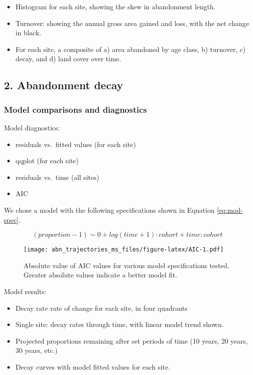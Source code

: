 \documentclass[
]{article}
\providecommand{\tightlist}{%
  \setlength{\itemsep}{0pt}\setlength{\parskip}{0pt}}
\begin{document}
\begin{itemize}
\tightlist
\item
  Histogram for each site, showing the skew in abandonment length.
\item
  Turnover: showing the annual gross area gained and loss, with the net change in black.
\item
  For each site, a composite of a) area abandoned by age class, b) turnover, c) decay, and d) land cover over time.
\end{itemize}

\hypertarget{abandonment-decay}{%
\subsection{2. Abandonment decay}\label{abandonment-decay}}

\hypertarget{mod-AIC-diag}{%
\subsubsection{Model comparisons and diagnostics}\label{mod-AIC-diag}}

Model diagnostics:

\begin{itemize}
\tightlist
\item
  residuals vs.~fitted values (for each site)
\item
  qqplot (for each site)
\item
  residuals vs.~time (all sites)
\item
  AIC
\end{itemize}

We chose a model with the following specifications shown in Equation \eqref{eq:mod-spec}.

\begin{equation}
(proportion - 1) \sim 0 + log(time + 1):cohort + time:cohort \label{eq:mod-spec}
\end{equation}



\begin{figure}
\centering
\texttt{[image: abn\_trajectories\_ms\_files/figure-latex/AIC-1.pdf]}
\caption{\label{fig:AIC}Absolute value of AIC values for various model specifications tested. Greater absolute values indicate a better model fit.}
\end{figure}



Model results:

\begin{itemize}
\tightlist
\item
  Decay rate rate of change for each site, in four quadrants
\item
  Single site: decay rates through time, with linear model trend shown.
\item
  Projected proportions remaining after set periods of time (10 years, 20 years, 30 years, etc.)
\item
  Decay curves with model fitted values for each site.
\end{itemize}
\end{document}
